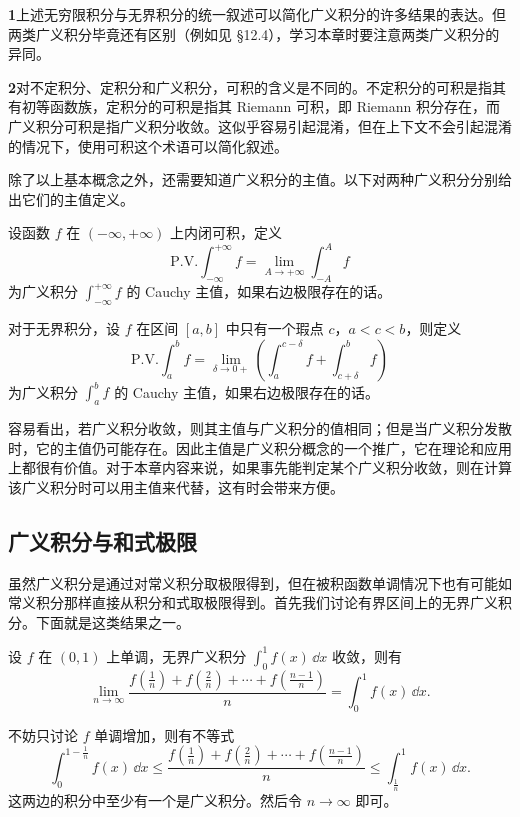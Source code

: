 \begin{xremark}
\textbf{1}\quad 上述无穷限积分与无界积分的统一叙述可以简化广义积分的许多结果的表达。但两类广义积分毕竟还有区别（例如见 §12.4），学习本章时要注意两类广义积分的异同。
\end{xremark}

\begin{xremark}
\textbf{2}\quad 对不定积分、定积分和广义积分，可积的含义是不同的。不定积分的可积是指其有初等函数族，定积分的可积是指其 Riemann 可积，即 Riemann 积分存在，而广义积分可积是指广义积分收敛。这似乎容易引起混淆，但在上下文不会引起混淆的情况下，使用可积这个术语可以简化叙述。
\end{xremark}

除了以上基本概念之外，还需要知道广义积分的主值。以下对两种广义积分分别给出它们的主值定义。

设函数 $f$ 在 $(-\infty,+\infty)$ 上内闭可积，定义
\[
  \mathrm{P.V.}\int_{-\infty}^{+\infty}f=\lim_{A\to+\infty}\int_{-A}^{A}f
\]
为广义积分 $\int_{-\infty}^{+\infty}f$ 的 Cauchy 主值，如果右边极限存在的话。

对于无界积分，设 $f$ 在区间 $[a,b]$ 中只有一个瑕点 $c$，$a<c<b$，则定义
\[
  \mathrm{P.V.}\int_a^b f=\lim_{\delta\to0+}\left(\int_a^{c-\delta}f+\int_{c+\delta}^bf\right)
\]
为广义积分 $\int_a^b f$ 的 Cauchy 主值，如果右边极限存在的话。

容易看出，若广义积分收敛，则其主值与广义积分的值相同；但是当广义积分发散时，它的主值仍可能存在。因此主值是广义积分概念的一个推广，它在理论和应用上都很有价值。对于本章内容来说，如果事先能判定某个广义积分收敛，则在计算该广义积分时可以用主值来代替，这有时会带来方便。

\subsection{广义积分与和式极限}

虽然广义积分是通过对常义积分取极限得到，但在被积函数单调情况下也有可能如常义积分那样直接从积分和式取极限得到。首先我们讨论有界区间上的无界广义积分。下面就是这类结果之一。

\begin{xexample}[12.1.1]
设 $f$ 在 $(0,1)$ 上单调，无界广义积分 $\int_0^1 f(x)\,\dd x$ 收敛，则有
\begin{equation}
  \lim_{n\to\infty}\frac{f\left(\frac1n\right)+f\left(\frac2n\right)+\cdots+f\left(\frac{n-1}{n}\right)}{n}=\int_0^1 f(x)\,\dd x.
  \tag{12.1}
  \label{eq:12.1}
\end{equation}
\end{xexample}
\begin{xproof}
不妨只讨论 $f$ 单调增加，则有不等式
\[
  \int_0^{1-\frac1n}f(x)\,\dd x
  \leq
  \frac{f\left(\frac1n\right)+f\left(\frac2n\right)+\cdots+f\left(\frac{n-1}{n}\right)}{n}
  \leq
  \int_{\frac1n}^1 f(x)\,\dd x.
\]
这两边的积分中至少有一个是广义积分。然后令 $n\to\infty$ 即可。
\end{xproof}

